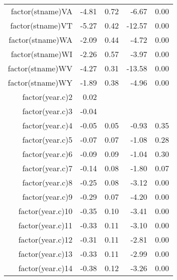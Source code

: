 \begin{table}[ht]
\begin{tabular}{rrrrr}
  factor(stname)VA & -4.81 & 0.72 & -6.67 & 0.00 \\ 
  factor(stname)VT & -5.27 & 0.42 & -12.57 & 0.00 \\ 
  factor(stname)WA & -2.09 & 0.44 & -4.72 & 0.00 \\ 
  factor(stname)WI & -2.26 & 0.57 & -3.97 & 0.00 \\ 
  factor(stname)WV & -4.27 & 0.31 & -13.58 & 0.00 \\ 
  factor(stname)WY & -1.89 & 0.38 & -4.96 & 0.00 \\ 
  factor(year.c)2 & 0.02 &  &  &  \\ 
  factor(year.c)3 & -0.04 &  &  &  \\ 
  factor(year.c)4 & -0.05 & 0.05 & -0.93 & 0.35 \\ 
  factor(year.c)5 & -0.07 & 0.07 & -1.08 & 0.28 \\ 
  factor(year.c)6 & -0.09 & 0.09 & -1.04 & 0.30 \\ 
  factor(year.c)7 & -0.14 & 0.08 & -1.80 & 0.07 \\ 
  factor(year.c)8 & -0.25 & 0.08 & -3.12 & 0.00 \\ 
  factor(year.c)9 & -0.29 & 0.07 & -4.20 & 0.00 \\ 
  factor(year.c)10 & -0.35 & 0.10 & -3.41 & 0.00 \\ 
  factor(year.c)11 & -0.33 & 0.11 & -3.10 & 0.00 \\ 
  factor(year.c)12 & -0.31 & 0.11 & -2.81 & 0.00 \\ 
  factor(year.c)13 & -0.33 & 0.11 & -2.99 & 0.00 \\ 
  factor(year.c)14 & -0.38 & 0.12 & -3.26 & 0.00 \\ 
   \hline
\end{tabular}
\end{table}
